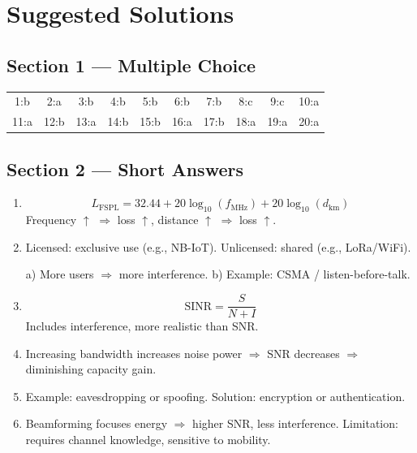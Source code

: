 \section*{Suggested Solutions}

\subsection*{Section 1 --- Multiple Choice}

\begin{center}
\begin{tabular}{cccccccccc}
1:b & 2:a & 3:b & 4:b & 5:b & 6:b & 7:b & 8:c & 9:c & 10:a \\
11:a & 12:b & 13:a & 14:b & 15:b & 16:a & 17:b & 18:a & 19:a & 20:a
\end{tabular}
\end{center}

\vspace{0.5cm}

\subsection*{Section 2 --- Short Answers}

\begin{enumerate}[leftmargin=0.9cm]

\item 
\[
L_{\mathrm{FSPL}} = 32.44 + 20\log_{10}(f_{\mathrm{MHz}}) + 20\log_{10}(d_{\mathrm{km}})
\]
Frequency $\uparrow$ $\Rightarrow$ loss $\uparrow$, distance $\uparrow$ $\Rightarrow$ loss $\uparrow$.

\item 
Licensed: exclusive use (e.g., NB-IoT).  
Unlicensed: shared (e.g., LoRa/WiFi).  

a) More users $\Rightarrow$ more interference.  
b) Example: CSMA / listen-before-talk.

\item 
\[
\mathrm{SINR} = \frac{S}{N+I}
\]
Includes interference, more realistic than SNR.

\item 
Increasing bandwidth increases noise power $\Rightarrow$ SNR decreases $\Rightarrow$ diminishing capacity gain.

\item 
Example: eavesdropping or spoofing.  
Solution: encryption or authentication.

\item 
Beamforming focuses energy $\Rightarrow$ higher SNR, less interference.  
Limitation: requires channel knowledge, sensitive to mobility.

\end{enumerate}

